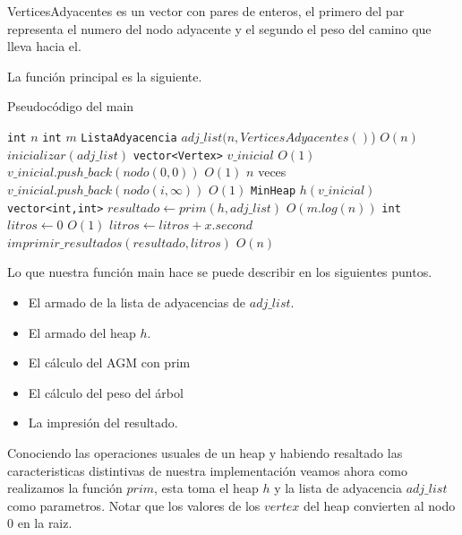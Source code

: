 VerticesAdyacentes es un vector con pares de enteros, el primero del par representa el numero del nodo adyacente y el segundo el peso del camino que lleva hacia el.

La función principal es la siguiente.

\begin{algorithm}[H]
  \begin{algorithmic}[1]
  \caption{Pseudocódigo del main}
  \label{algo:2-1}
    	\State \texttt{int} $n$
    	\State \texttt{int} $m$
    	\State \texttt{ListaAdyacencia} $adj\_list(n, VerticesAdyacentes()$)
    	\Comment $O(n)$
	\State $inicializar(adj\_list)$
    	\normalsize
    	\State \texttt{vector<Vertex>} $ v\_inicial$
    	\Comment $O(1)$
    	\State $v\_inicial.push\_back( nodo(0,0) ) $
    	\Comment $O(1)$
    	\Comment $n$ veces
    		\State $v\_inicial.push\_back( nodo(i,\infty) ) $
    		\Comment $O(1)$
    	\EndFor
    	\State \texttt{MinHeap} $h(v\_inicial)$
    	\State \texttt{vector<int,int>} $resultado \gets prim(h,adj\_list)$
    	\Comment $O(m.log(n))$
    	\State \texttt{int} $litros \gets 0$
    	\Comment $O(1)$
    		\State $litros \gets litros + x.second$
    	\EndFor
	\State $imprimir\_resultados(resultado, litros)$
	\Comment $ O(n) $
		\EndProcedure
  \end{algorithmic}
  \end{algorithm}

Lo que nuestra función main hace se puede describir en los siguientes puntos.

\begin{itemize}
	\item El armado de la lista de adyacencias de $adj\_list$.
	\item El armado del heap $h$.
	\item El cálculo del AGM con prim
	\item El cálculo del peso del árbol	
	\item La impresión del resultado.
\end{itemize}

Conociendo las operaciones usuales de un heap y habiendo resaltado las caracteristicas distintivas de nuestra implementación veamos ahora como realizamos la función $prim$, esta toma el heap $h$ y la lista de adyacencia $adj\_list$ como parametros. Notar que los valores de los $vertex$ del heap convierten al nodo 0 en la raiz.


